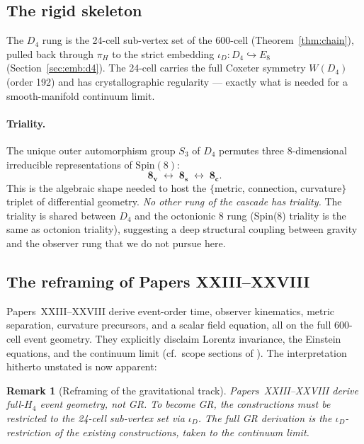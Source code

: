 \documentclass[12pt]{article}
\newtheorem{remark}[theorem]{Remark}
\begin{document}
\subsection{The rigid skeleton}\label{sec:gr:skeleton}

The $D_4$ rung is the 24-cell sub-vertex set of the 600-cell (Theorem~\ref{thm:chain}), pulled back through $\pi_H$ to the strict embedding $\iota_D : D_4 \hookrightarrow E_8$ (Section~\ref{sec:emb:d4}). The 24-cell carries the full Coxeter symmetry $W(D_4)$ (order 192) and has crystallographic regularity --- exactly what is needed for a smooth-manifold continuum limit.

\paragraph{Triality.} The unique outer automorphism group $S_3$ of $D_4$ permutes three 8-dimensional irreducible representations of $\mathrm{Spin}(8)$:
\begin{equation}\label{eq:triality}
\mathbf{8_v} \;\longleftrightarrow\; \mathbf{8_s} \;\longleftrightarrow\; \mathbf{8_c}.
\end{equation}
This is the algebraic shape needed to host the $\{$metric, connection, curvature$\}$ triplet of differential geometry. \emph{No other rung of the cascade has triality.} The triality is shared between $D_4$ and the octonionic 8 rung (Spin(8) triality is the same as octonion triality), suggesting a deep structural coupling between gravity and the observer rung that we do not pursue here.

\subsection{The reframing of Papers XXIII--XXVIII}\label{sec:gr:reframing}

Papers~XXIII--XXVIII derive event-order time, observer kinematics, metric separation, curvature precursors, and a scalar field equation, all on the full 600-cell event geometry. They explicitly disclaim Lorentz invariance, the Einstein equations, and the continuum limit (cf.\ scope sections of \citep{SmartXXIV,SmartXXVI,SmartXXVII,SmartXXVIII}). The interpretation hitherto unstated is now apparent:

\begin{remark}[Reframing of the gravitational track]\label{rmk:gr-reframing}
Papers~XXIII--XXVIII derive \emph{full-$H_4$ event geometry}, not GR. To become GR, the constructions must be \emph{restricted to the 24-cell sub-vertex set} via $\iota_D$. The full GR derivation is the $\iota_D$-restriction of the existing constructions, taken to the continuum limit.
\end{remark}
\end{document}
